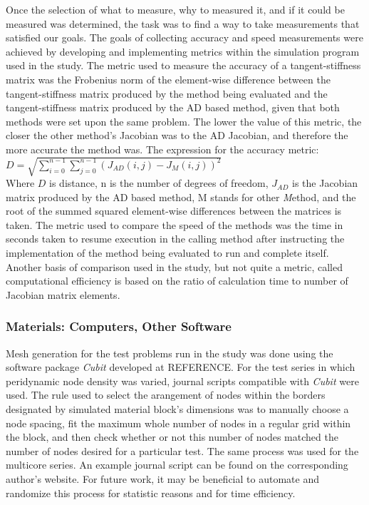 \documentclass[preprint,12pt]{elsarticle}
\begin{document}
Once the selection of what to measure, why to measured it, and if it could be measured was
determined, the task was to find a way to take measurements that satisfied our goals. The goals of
collecting accuracy and speed measurements were achieved by developing and implementing metrics
within the simulation program used in the study. The metric used to measure the accuracy of a
tangent-stiffness matrix was the Frobenius norm of the element-wise difference between the
tangent-stiffness matrix produced by the method being evaluated and the tangent-stiffness matrix
produced by the AD based method, given that both methods were set upon the same problem. The lower
the value of this metric, the closer the other method's Jacobian was to the AD Jacobian, and
therefore the more accurate the method was. The expression for the accuracy metric:\\ $D =
\sqrt{\sum_{i=0}^{n-1}\sum_{j=0}^{n-1} (J_{AD}(i,j) - J_{M}(i,j))^2}$\\ Where $D$ is distance, n is
the number of degrees of freedom, $J_{AD}$ is the Jacobian matrix produced by the AD based method, M
stands for other \emph{M}ethod, and the root of the summed squared element-wise differences between
the matrices is taken.  The metric used to compare the speed of the methods was the time in seconds
taken to resume execution in the calling method after instructing the implementation of the method
being evaluated to run and complete itself. Another basis of comparison used in the study, but not
quite a metric, called computational efficiency is based on the ratio of calculation time to number
of Jacobian matrix elements.

\subsubsection{Materials: Computers, Other Software} 

Mesh generation for the test problems run in the study was done using the software package
\emph{Cubit} developed at REFERENCE. For the test series in which peridynamic node density was
varied, journal scripts compatible with \emph{Cubit} were used. The rule used to select the
arangement of nodes within the borders designated by simulated material block's dimensions was to
manually choose a node spacing, fit the maximum whole number of nodes in a regular grid within the
block, and then check whether or not this number of nodes matched the number of nodes desired for a
particular test. The same process was used for the multicore series. An example journal script can
be found on the corresponding author's website. For future work, it may be beneficial to automate
and randomize this process for statistic reasons and for time efficiency. 
\end{document}

